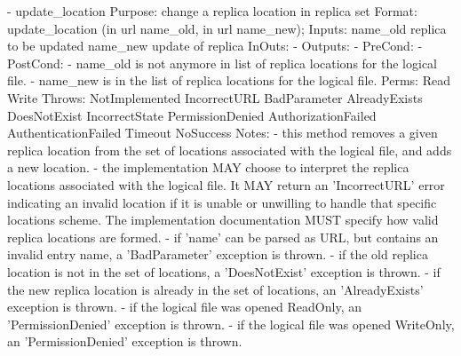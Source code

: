 \begin{myspec}
 
    - update_location
      Purpose:  change a replica location in replica set
      Format:   update_location  (in url       name_old,
                                  in url       name_new);
      Inputs:   name_old          replica to be updated
                name_new          update of replica
      InOuts:   -
      Outputs:  -
      PreCond:  -
      PostCond: - name_old is not anymore in list of replica 
                  locations for the logical file.
                - name_new is in the list of replica locations
                  for the logical file.
      Perms:    Read 
                Write
      Throws:   NotImplemented
                IncorrectURL
                BadParameter
                AlreadyExists
                DoesNotExist
                IncorrectState
                PermissionDenied
                AuthorizationFailed
                AuthenticationFailed
                Timeout
                NoSuccess
      Notes:    - this method removes a given replica location 
                  from the set of locations associated with the 
                  logical file, and adds a new location.
                - the implementation MAY choose to interpret the
                  replica locations associated with the logical 
                  file.  It MAY return an 'IncorrectURL' error 
                  indicating an invalid location if it is unable 
                  or unwilling to handle that specific locations
                  scheme.  The implementation documentation MUST 
                  specify how valid replica locations are formed.
                - if 'name' can be parsed as URL, but contains 
                  an invalid entry name, a 'BadParameter'
                  exception is thrown.
                - if the old replica location is not in the 
                  set of locations, a 'DoesNotExist' exception 
                  is thrown.
                - if the new replica location is already in the 
                  set of locations, an 'AlreadyExists' exception 
                  is thrown.
                - if the logical file was opened ReadOnly, an
                  'PermissionDenied' exception is thrown.
                - if the logical file was opened WriteOnly, an
                  'PermissionDenied' exception is thrown.
 

\end{myspec}

